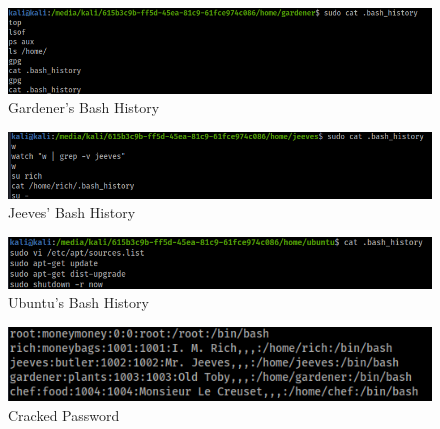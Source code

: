 \documentclass[a4paper,12pt]{article}
\begin{document}
\begin{figure}[H]
	\begin{center}
		\includegraphics[scale = 0.55]{img/act1/gardenerBash.png} 
	\end{center}
	\caption{Gardener's Bash History}
	\label{gardener}
\end{figure}

\begin{figure}[H]
	\begin{center}
		\includegraphics[scale = 0.55]{img/act1/jeevesBash.png} 
	\end{center}
	\caption{Jeeves' Bash History}
	\label{jeeves}
\end{figure}

\begin{figure}[H]
	\begin{center}
		\includegraphics[scale = 0.55]{img/act1/ubuntuBash} 
	\end{center}
	\caption{Ubuntu's Bash History}
	\label{ubuntu}
\end{figure}

\begin{figure}[H]
	\begin{center}
		\includegraphics[scale = 0.55]{img/act1/crack.png} 
	\end{center}
	\caption{Cracked Password}
	\label{crack}
\end{figure}




%
%
\end{document}
